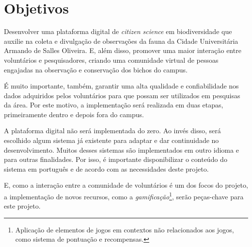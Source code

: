 \section{Objetivos}
Desenvolver uma plataforma digital de \emph{citizen science} em biodiversidade que auxilie na coleta e divulgação de observações da fauna da Cidade Universitária Armando de Salles Oliveira. E, além disso, promover uma maior interação entre voluntários e pesquisadores, criando uma comunidade virtual de pessoas engajadas na observação e conservação dos bichos do campus.

É muito importante, também, garantir uma alta qualidade e confiabilidade nos dados adquiridos pelos voluntários para que possam ser utilizados em pesquisas da área. Por este motivo, a implementação será realizada em duas etapas, primeiramente dentro e depois fora do campus.

A plataforma digital não será implementada do zero. Ao invés disso, será escolhido algum sistema já existente para adaptar e dar continuidade no desenvolvimento. Muitos desses sistemas são implementados em outro idioma e para outras finalidades. Por isso, é importante disponibilizar o conteúdo do sistema em português e de acordo com as necessidades deste projeto.

E, como a interação entre a comunidade de voluntários é um dos focos do projeto, a implementação de novos recursos, como a \emph{gamificação}\footnote{Aplicação de elementos de jogos em contextos não relacionados aos jogos, como sistema de pontuação e recompensas.}, serão peças-chave para este projeto.